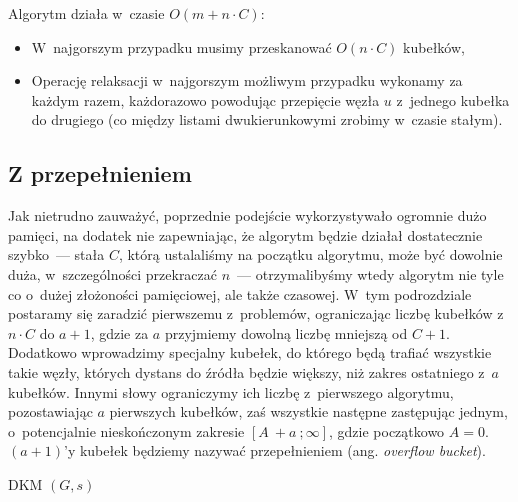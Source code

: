 Algorytm działa w~czasie $ O \left( m + n \cdot C \right) $:

\begin{itemize}
\item W~najgorszym przypadku musimy przeskanować $ O \left( n \cdot C \right)$ kubełków,
\item Operację relaksacji w~najgorszym możliwym przypadku wykonamy za każdym razem, każdorazowo powodując przepięcie węzła $u$ z~jednego kubełka do drugiego (co między listami dwukierunkowymi zrobimy w~czasie stałym).
\end{itemize}

\subsection{Z przepełnieniem}

Jak nietrudno zauważyć, poprzednie podejście wykorzystywało ogromnie dużo pamięci, na dodatek nie zapewniając, że algorytm będzie działał dostatecznie szybko~--- stała $C$, którą ustalaliśmy na początku algorytmu, może być dowolnie duża, w~szczególności przekraczać $n$~--- otrzymalibyśmy wtedy algorytm nie tyle co o~dużej złożoności pamięciowej, ale także czasowej. W~tym podrozdziale postaramy się zaradzić pierwszemu z~problemów, ograniczając liczbę kubełków z~$n \cdot C$ do $a + 1$, gdzie za $a$ przyjmiemy dowolną liczbę mniejszą od $C + 1$. Dodatkowo wprowadzimy specjalny kubełek, do którego będą trafiać wszystkie takie węzły, których dystans do źródła będzie większy, niż zakres ostatniego z~$a$ kubełków. Innymi słowy ograniczymy ich liczbę z~pierwszego algorytmu, pozostawiając $a$ pierwszych kubełków, zaś wszystkie następne zastępując jednym, o~potencjalnie nieskończonym zakresie $ \left [ A~+ a~; \infty \right] $, gdzie początkowo $A = 0$. $\left( a + 1 \right)$'y kubełek będziemy nazywać przepełnieniem (ang. \textit{overflow bucket}).

\begin{pseudokod}[!htbp]
\DontPrintSemicolon
{}
\caption{ DKM $\left( G, s \right)$\label{alg:OverflowBucket}}
\end{pseudokod}

